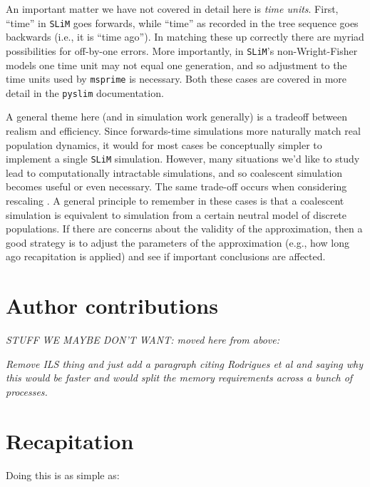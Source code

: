 \documentclass[12pt]{article}
\newcommand{\msprime}[0]{\texttt{msprime}\xspace}
\newcommand{\slim}[0]{\texttt{SLiM}\xspace}
\newcommand{\pyslim}[0]{\texttt{pyslim}\xspace}
\newcommand{\comment}[1]{\textit{\color{green} #1}}
\begin{document}
An important matter we have not covered in detail here is \emph{time units}.
First, ``time'' in \slim goes forwards, while ``time'' as recorded in the tree sequence goes backwards (i.e., it is ``time ago'').
In matching these up correctly there are myriad possibilities for off-by-one errors.
More importantly, in \slim's non-Wright-Fisher models one time unit may not equal one generation,
and so adjustment to the time units used by \msprime is necessary.
Both these cases are covered in more detail in the \pyslim documentation.

A general theme here (and in simulation work generally)
is a tradeoff between realism and efficiency.
Since forwards-time simulations more naturally match real population dynamics,
it would for most cases be conceptually simpler to implement a single \slim simulation.
However, many situations we'd like to study lead to computationally intractable simulations,
and so coalescent simulation becomes useful or even necessary.
The same trade-off occurs when considering rescaling \citep{cury_simulation_2022,dabi_population_2025}.
A general principle to remember in these cases is that a coalescent simulation is equivalent
to simulation from a certain neutral model of discrete populations.
If there are concerns about the validity of the approximation,
then a good strategy is to adjust the parameters of the approximation (e.g., how long ago recapitation is applied)
and see if important conclusions are affected.


\section*{Author contributions}




\newpage
\appendix

\comment{STUFF WE MAYBE DON'T WANT: moved here from above:}

\comment{Remove ILS thing and just add a paragraph citing Rodrigues et al and saying why this would be faster and would split the memory requirements across a bunch of processes.}

\section{Recapitation}


Doing this is as simple as:
\end{document}
